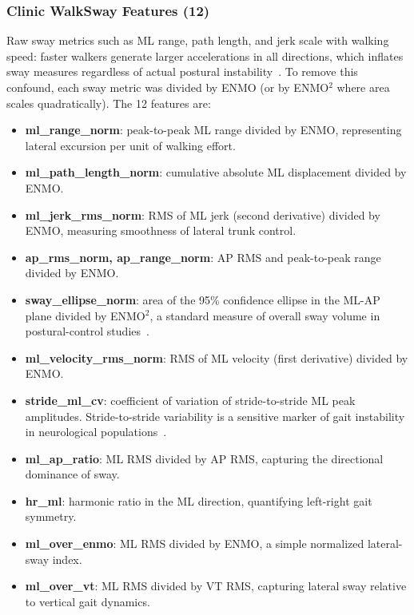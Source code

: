 \documentclass{article}
\begin{document}
\subsubsection{Clinic WalkSway Features (12)}
Raw sway metrics such as ML range, path length, and jerk scale with walking speed: faster walkers generate larger accelerations in all directions, which inflates sway measures regardless of actual postural instability~\cite{mancini2012isway, meyer2023chest}. To remove this confound, each sway metric was divided by ENMO (or by ENMO$^2$ where area scales quadratically). The 12 features are:
\begin{itemize}
    \item \textbf{ml\_range\_norm}: peak-to-peak ML range divided by ENMO, representing lateral excursion per unit of walking effort.
    \item \textbf{ml\_path\_length\_norm}: cumulative absolute ML displacement divided by ENMO.
    \item \textbf{ml\_jerk\_rms\_norm}: RMS of ML jerk (second derivative) divided by ENMO, measuring smoothness of lateral trunk control.
    \item \textbf{ap\_rms\_norm, ap\_range\_norm}: AP RMS and peak-to-peak range divided by ENMO.
    \item \textbf{sway\_ellipse\_norm}: area of the 95\% confidence ellipse in the ML-AP plane divided by ENMO$^2$, a standard measure of overall sway volume in postural-control studies~\cite{mancini2012isway, meyer2023chest}.
    \item \textbf{ml\_velocity\_rms\_norm}: RMS of ML velocity (first derivative) divided by ENMO.
    \item \textbf{stride\_ml\_cv}: coefficient of variation of stride-to-stride ML peak amplitudes. Stride-to-stride variability is a sensitive marker of gait instability in neurological populations~\cite{kalron2015association, phan2020random}.
    \item \textbf{ml\_ap\_ratio}: ML RMS divided by AP RMS, capturing the directional dominance of sway.
    \item \textbf{hr\_ml}: harmonic ratio in the ML direction, quantifying left-right gait symmetry.
    \item \textbf{ml\_over\_enmo}: ML RMS divided by ENMO, a simple normalized lateral-sway index.
    \item \textbf{ml\_over\_vt}: ML RMS divided by VT RMS, capturing lateral sway relative to vertical gait dynamics.
\end{itemize}
\end{document}
